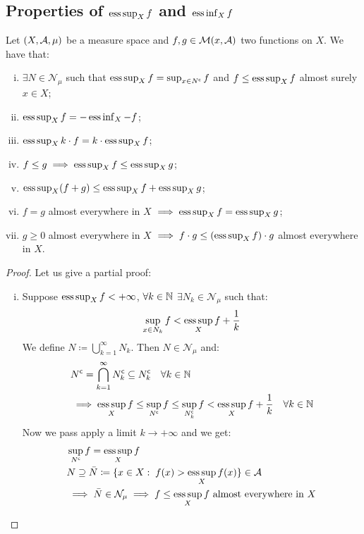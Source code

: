 \subsection{Properties of \texorpdfstring{$\operatorname*{ess\,sup}_X f$}{essup f} and \texorpdfstring{$\operatorname*{ess\,inf}_X f$}{essinf f}}
Let $(X, \mathcal{A}, \mu)$ be a measure space and $f,g\in\mathcal{M}(x,\mathcal{A})$ two functions on $X$. We have that:
\begin{enumerate}[i)]
    \item $\exists N \in \mathcal{N}_\mu$ such that $\operatorname*{ess\,sup}_X f = \sup_{x\in N^{\mathsf{c}}} f$ and $f\leq \operatorname*{ess\,sup}_X f$ almost surely $x\in X$;
    \item $\operatorname*{ess\,sup}_X f = -\operatorname*{ess\,inf}_X -f$;
    \item $\operatorname*{ess\,sup}_X k\cdot f  = k \cdot \operatorname*{ess\,sup}_X f$;
    \item $f\leq g \implies \operatorname*{ess\,sup}_X f \leq \operatorname*{ess\,sup}_X g$;
    \item $\operatorname*{ess\,sup}_X (f+g) \leq \operatorname*{ess\,sup}_X f + \operatorname*{ess\,sup}_X g$;
    \item $f = g$ almost everywhere in $X$ $\implies \operatorname*{ess\,sup}_X f = \operatorname*{ess\,sup}_X g$;
    \item $g \geq 0$ almost everywhere in $X$ $\implies f\cdot g \leq (\operatorname*{ess\,sup}_X f)\cdot g$ almost everywhere in $X$.
\end{enumerate}

\begin{proof}
    Let us give a partial proof:
    \begin{enumerate}[i)]
        \item Suppose $\operatorname*{ess\,sup}_X f < +\infty$, $\forall k\in\mathbb{N}$ $\exists N_k \in \mathcal{N}_\mu$ such that:
              \[
                  \sup_{x\in N_k} f < \operatorname*{ess\,sup}_X f + \frac{1}{k}
              \]
              We define $N \coloneqq \bigcup_{k=1}^\infty N_k$. Then $N \in \mathcal{N}_\mu$ and:
              \begin{align*}
                   & N^{\mathsf{c}} = \bigcap_{k=1}^\infty N^{\mathsf{c}}_k \subseteq N^{\mathsf{c}}_k \quad \forall k \in \mathbb{N}                              \\
                   & \implies  \operatorname*{ess\,sup}_X f \leq \sup_{N^{\mathsf{c}}} f \leq \sup_{N^{\mathsf{c}}_k} f < \operatorname*{ess\,sup}_X f + \frac{1}{k} \quad \forall k \in \mathbb{N}
              \end{align*}
              Now we pass apply a limit $k\to+\infty$ and we get:
              \begin{align*}
                   & \sup_{N^{\mathsf{c}}} f = \operatorname*{ess\,sup}_X f                                                             \\
                   & N \supseteq \bar{N} \coloneqq \{ x\in X: \; f(x) > \operatorname*{ess\,sup}_X f(x) \} \in\mathcal{A}                       \\
                   & \implies \bar{N} \in \mathcal{N}_\mu \implies f \leq \operatorname*{ess\,sup}_X f \text{ almost everywhere in } X
              \end{align*}
    \end{enumerate}
\end{proof}

